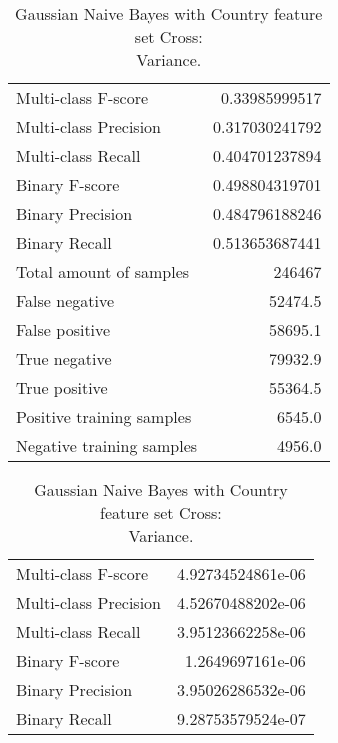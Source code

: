 \begin{table}[H]
\begin{minipage}{0.5\textwidth}
\caption{Gaussian Naive Bayes with Country feature set Cross: \\Average.}
\centering
\begin{tabular}{l r}
\toprule
Multi-class F-score & 0.33985999517 \\
Multi-class Precision & 0.317030241792 \\
Multi-class Recall & 0.404701237894 \\
\midrule
Binary F-score & 0.498804319701 \\
Binary Precision & 0.484796188246 \\
Binary Recall & 0.513653687441 \\
\midrule
Total amount of samples & 246467 \\
False negative & 52474.5 \\
False positive & 58695.1 \\
True negative & 79932.9 \\
True positive & 55364.5 \\
\midrule
Positive training samples & 6545.0 \\
Negative training samples & 4956.0 \\
\bottomrule
\end{tabular}
\end{minipage}
\hfillx
\begin{minipage}{0.5\textwidth}
\caption{Gaussian Naive Bayes with Country feature set Cross: \\Variance.}
\centering
\begin{tabular}{l r}
\toprule
Multi-class F-score & 4.92734524861e-06 \\
Multi-class Precision & 4.52670488202e-06 \\
Multi-class Recall & 3.95123662258e-06 \\
\midrule
Binary F-score & 1.2649697161e-06 \\
Binary Precision & 3.95026286532e-06 \\
Binary Recall & 9.28753579524e-07 \\
\bottomrule
\end{tabular}
\end{minipage}
\end{table}
